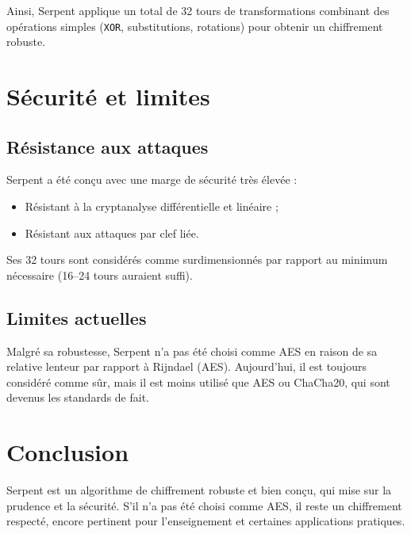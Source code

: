 \documentclass[12pt,a4paper]{report}
\begin{document}
Ainsi, Serpent applique un total de 32 tours de transformations combinant 
des opérations simples (\texttt{XOR}, substitutions, rotations) pour obtenir un chiffrement robuste.







\section*{Sécurité et limites}

\setcounter{subsection}{0}

\subsection{Résistance aux attaques}
Serpent a été conçu avec une marge de sécurité très élevée :
\begin{itemize}
    \item Résistant à la cryptanalyse différentielle et linéaire ;
    \item Résistant aux attaques par clef liée.
\end{itemize}
Ses 32 tours sont considérés comme surdimensionnés par rapport au minimum nécessaire (16–24 tours auraient suffi).

\subsection{Limites actuelles}

Malgré sa robustesse, Serpent n’a pas été choisi comme AES en raison de sa relative lenteur par rapport à Rijndael (AES).  
Aujourd’hui, il est toujours considéré comme sûr, mais il est moins utilisé que AES ou ChaCha20, qui sont devenus les standards de fait.

\section*{Conclusion}

Serpent est un algorithme de chiffrement robuste et bien conçu, qui mise sur la prudence et la sécurité.  
S’il n’a pas été choisi comme AES, il reste un chiffrement respecté, encore pertinent pour l’enseignement et certaines applications pratiques.
\end{document}
